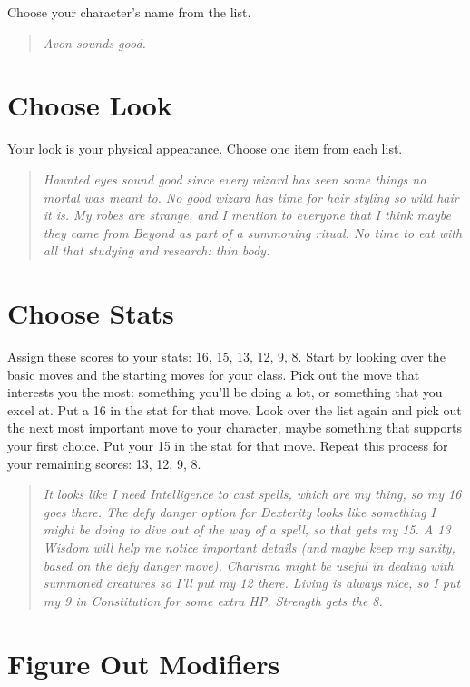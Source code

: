  Choose your character's name from the list.


 \begin{quote}
\emph{Avon sounds good.}
\end{quote}
\section{Choose Look}


 Your look is your physical appearance. Choose one item from each list.


\begin{quote}
\emph{ Haunted eyes sound good since every wizard has seen some things no mortal was meant to. No good wizard has time for hair styling so wild hair it is. My robes are strange, and I mention to everyone that I think maybe they came from Beyond as part of a summoning ritual. No time to eat with all that studying and research: thin body.}
\end{quote}
\section{Choose Stats}


 Assign these scores to your stats: 16, 15, 13, 12, 9, 8. Start by looking over the basic moves and the starting moves for your class. Pick out the move that interests you the most: something you'll be doing a lot, or something that you excel at. Put a 16 in the stat for that move. Look over the list again and pick out the next most important move to your character, maybe something that supports your first choice. Put your 15 in the stat for that move. Repeat this process for your remaining scores: 13, 12, 9, 8.

\begin{quote}
\emph{ It looks like I need Intelligence to cast spells, which are my thing, so my 16 goes there. The defy danger option for Dexterity looks like something I might be doing to dive out of the way of a spell, so that gets my 15. A 13 Wisdom will help me notice important details (and maybe keep my sanity, based on the defy danger move). Charisma might be useful in dealing with summoned creatures so I'll put my 12 there. Living is always nice, so I put my 9 in Constitution for some extra HP. Strength gets the 8.}
\end{quote}
\section{Figure Out Modifiers}


